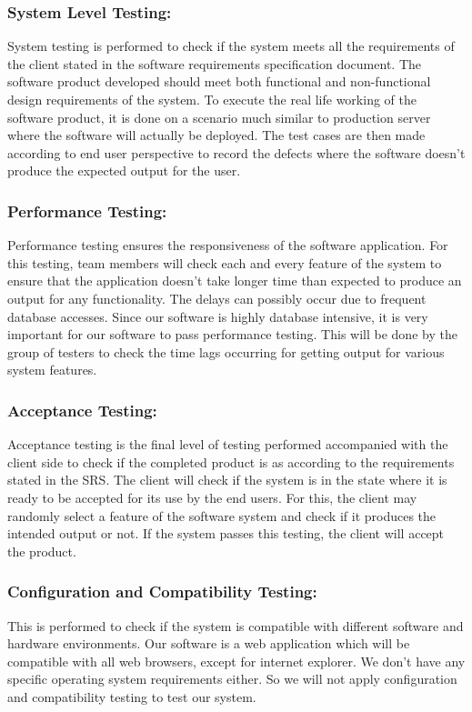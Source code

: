 \documentclass[12pt]{article}
\begin{document}
\subsubsection{System Level Testing:}
System testing is performed to check if the system meets all the requirements of the client stated in the software requirements specification document. The software product developed should meet both functional and non-functional design requirements of the system. To execute the real life working of the software product, it is done on a scenario much similar to production server where the software will actually be deployed. The test cases are then made according to end user perspective to record the defects where the software doesn’t produce the expected output for the user.

\subsubsection{Performance Testing:}
Performance testing ensures the responsiveness of the software application. For this testing, team members will check each and every feature of the system to ensure that the application doesn’t take longer time than expected to produce an output for any functionality. The delays can possibly occur due to frequent database accesses. Since our software is highly database intensive, it is very important for our software to pass performance testing. This will be done by the group of testers to check the time lags occurring for getting output for various system features.

\subsubsection{Acceptance Testing:}
Acceptance testing is the final level of testing performed accompanied with the client side to check if the completed product is as according to the requirements stated in the SRS. The client will check if the system is in the state where it is ready to be accepted for its use by the end users. For this, the client may randomly select a feature of the software system and check if it produces the intended output or not. If the system passes this testing, the client will accept the product.

\subsubsection{Configuration and Compatibility Testing:}
This is performed to check if the system is compatible with different software and hardware environments. Our software is a web application which will be compatible with all web browsers, except for internet explorer. We don’t have any specific operating system requirements either. So we will not apply configuration and compatibility testing to test our system.
\end{document}
